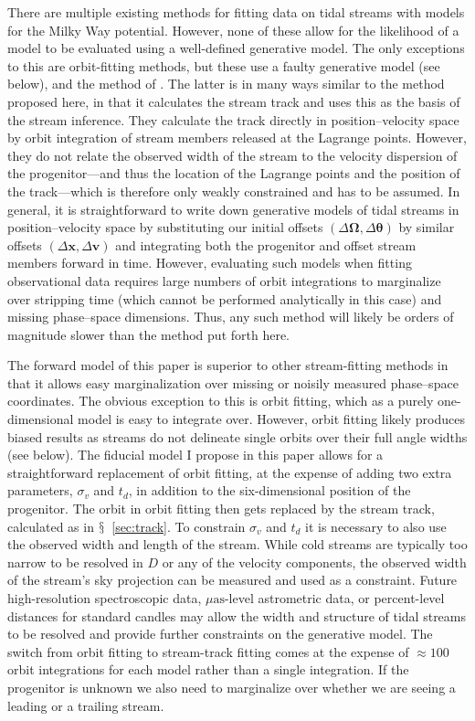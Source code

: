 \documentclass{emulateapj}
\newcommand{\sectionname}{$\mathsection$}
\renewcommand{\vec}[1]{\ensuremath{\mathbf{#1}}}
\newcommand{\vecx}{\ensuremath{\vec{x}}}
\newcommand{\vecv}{\ensuremath{\vec{v}}}
\newcommand{\veco}{\ensuremath{\vec{\Omega}}}
\newcommand{\veca}{\ensuremath{\boldsymbol\theta}}
\newcommand{\sigv}{\ensuremath{\sigma_v}}
\begin{document}
There are multiple existing methods for fitting data on tidal streams
with models for the Milky Way potential. However, none of these allow
for the likelihood of a model to be evaluated using a well-defined
generative model. The only exceptions to this are orbit-fitting
methods, but these use a faulty generative model (see below), and the
method of \citet{Varghese11a}. The latter is in many ways similar to
the method proposed here, in that it calculates the stream track and
uses this as the basis of the stream inference. They calculate the
track directly in position--velocity space by orbit integration of
stream members released at the Lagrange points. However, they do not
relate the observed width of the stream to the velocity dispersion of
the progenitor---and thus the location of the Lagrange points and the
position of the track---which is therefore only weakly constrained and
has to be assumed. In general, it is straightforward to write down
generative models of tidal streams in position--velocity space by
substituting our initial offsets $(\Delta \veco,\Delta \veca)$ by
similar offsets $(\Delta \vecx,\Delta \vecv)$ and integrating both the
progenitor and offset stream members forward in time. However,
evaluating such models when fitting observational data requires large
numbers of orbit integrations to marginalize over stripping time
(which cannot be performed analytically in this case) and missing
phase--space dimensions. Thus, any such method will likely be orders
of magnitude slower than the method put forth here.

The forward model of this paper is superior to other stream-fitting
methods in that it allows easy marginalization over missing or noisily
measured phase--space coordinates. The obvious exception to this is
orbit fitting, which as a purely one-dimensional model is easy to
integrate over. However, orbit fitting likely produces biased results
as streams do not delineate single orbits over their full angle widths
(see below). The fiducial model I propose in this paper allows for a
straightforward replacement of orbit fitting, at the expense of adding
two extra parameters, $\sigv$ and $t_d$, in addition to the
six-dimensional position of the progenitor. The orbit in orbit fitting
then gets replaced by the stream track, calculated as in
\sectionname~\ref{sec:track}. To constrain $\sigv$ and $t_d$ it is
necessary to also use the observed width and length of the
stream. While cold streams are typically too narrow to be resolved in
$D$ or any of the velocity components, the observed width of the
stream's sky projection can be measured and used as a
constraint. Future high-resolution spectroscopic data,
$\mu\mathrm{as}$-level astrometric data, or percent-level distances
for standard candles may allow the width and structure of tidal
streams to be resolved and provide further constraints on the
generative model. The switch from orbit fitting to stream-track
fitting comes at the expense of $\approx100$ orbit integrations for
each model rather than a single integration. If the progenitor is
unknown we also need to marginalize over whether we are seeing a
leading or a trailing stream.
\end{document}
